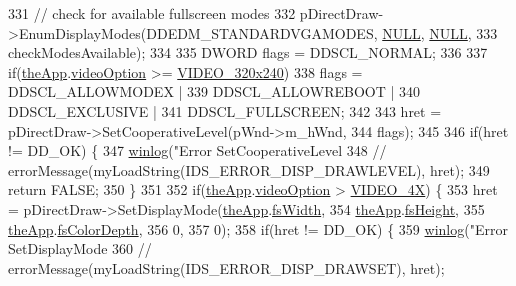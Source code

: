 \begin{DoxyCode}
{{{{331   \textcolor{comment}{// check for available fullscreen modes}
332   pDirectDraw->EnumDisplayModes(DDEDM\_STANDARDVGAMODES, \mbox{\hyperlink{getopt1_8c_a070d2ce7b6bb7e5c05602aa8c308d0c4}{NULL}}, \mbox{\hyperlink{getopt1_8c_a070d2ce7b6bb7e5c05602aa8c308d0c4}{NULL}},
333                                 checkModesAvailable);
334   
335   DWORD flags = DDSCL\_NORMAL;
336 
337   \textcolor{keywordflow}{if}(\mbox{\hyperlink{_v_b_a_8cpp_a8095a9d06b37a7efe3723f3218ad8fb3}{theApp}}.\mbox{\hyperlink{class_v_b_a_a17dac073149c897f770c00ed7098ad32}{videoOption}} >= \mbox{\hyperlink{_v_b_a_8h_a531c35e38ede3ea4e5ba5afb24b29493a658665cfbdbd908bdb77babe125d0341}{VIDEO\_320x240}})
338     flags = DDSCL\_ALLOWMODEX |
339       DDSCL\_ALLOWREBOOT |
340       DDSCL\_EXCLUSIVE |
341       DDSCL\_FULLSCREEN;
342   
343   hret = pDirectDraw->SetCooperativeLevel(pWnd->m\_hWnd,  
344                                           flags);
345 
346   \textcolor{keywordflow}{if}(hret != DD\_OK) \{
347     \mbox{\hyperlink{_direct_draw_8cpp_aceca31284db939464c9dc0fb15c92786}{winlog}}(\textcolor{stringliteral}{"Error SetCooperativeLevel %
348     \textcolor{comment}{//    errorMessage(myLoadString(IDS\_ERROR\_DISP\_DRAWLEVEL), hret);}
349     \textcolor{keywordflow}{return} FALSE;
350   \}
351   
352   \textcolor{keywordflow}{if}(\mbox{\hyperlink{_v_b_a_8cpp_a8095a9d06b37a7efe3723f3218ad8fb3}{theApp}}.\mbox{\hyperlink{class_v_b_a_a17dac073149c897f770c00ed7098ad32}{videoOption}} > \mbox{\hyperlink{_v_b_a_8h_a531c35e38ede3ea4e5ba5afb24b29493a6468bce6b84e6350d3de126f257eb38d}{VIDEO\_4X}}) \{
353     hret = pDirectDraw->SetDisplayMode(\mbox{\hyperlink{_v_b_a_8cpp_a8095a9d06b37a7efe3723f3218ad8fb3}{theApp}}.\mbox{\hyperlink{class_v_b_a_a92ef1c149914189da4d110d6dada54bb}{fsWidth}},
354                                        \mbox{\hyperlink{_v_b_a_8cpp_a8095a9d06b37a7efe3723f3218ad8fb3}{theApp}}.\mbox{\hyperlink{class_v_b_a_a1e59d9254f1cb6420502c537c35dd5ec}{fsHeight}},
355                                        \mbox{\hyperlink{_v_b_a_8cpp_a8095a9d06b37a7efe3723f3218ad8fb3}{theApp}}.\mbox{\hyperlink{class_v_b_a_a1baf02b3f4ad129bfd713f1a132e96b9}{fsColorDepth}},
356                                        0,
357                                        0);
358     \textcolor{keywordflow}{if}(hret != DD\_OK) \{
359       \mbox{\hyperlink{_direct_draw_8cpp_aceca31284db939464c9dc0fb15c92786}{winlog}}(\textcolor{stringliteral}{"Error SetDisplayMode %
360       \textcolor{comment}{//      errorMessage(myLoadString(IDS\_ERROR\_DISP\_DRAWSET), hret);}
}}}}}}
\end{DoxyCode}
